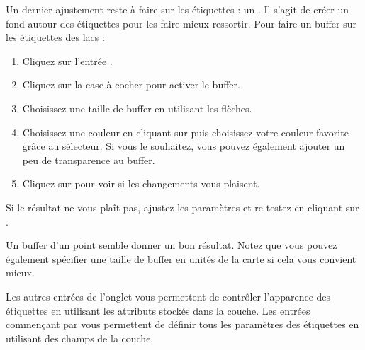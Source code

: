 Un dernier ajustement reste \`a faire sur les \'etiquettes : un . Il s'agit de cr\'eer un fond autour des \'etiquettes pour les faire mieux ressortir. Pour faire un buffer sur les \'etiquettes des lacs :

\begin{enumerate}
\item Cliquez sur l'entr\'ee .
\item Cliquez sur la case \`a cocher  pour activer le buffer.
\item Choisissez une taille de buffer en utilisant les fl\`eches.
\item Choisissez une couleur en cliquant sur  puis choisissez votre couleur favorite gr\^ace au s\'electeur. Si vous le souhaitez, vous pouvez \'egalement ajouter un peu de transparence au buffer.
\item Cliquez sur  pour voir si les changements vous plaisent.
\end{enumerate}

Si le r\'esultat ne vous pla\^it pas, ajustez les param\`etres et re-testez en cliquant sur .

Un buffer d'un point semble donner un bon r\'esultat. Notez que vous pouvez \'egalement sp\'ecifier une taille de buffer en unit\'es de la carte si cela vous convient mieux.

Les autres entr\'ees de l'onglet  vous permettent de contr\^oler l'apparence des \'etiquettes en utilisant les attributs stock\'es dans la couche. Les entr\'ees commen\c{c}ant par  vous permettent de d\'efinir tous les param\`etres des \'etiquettes en utilisant des champs de la couche.

